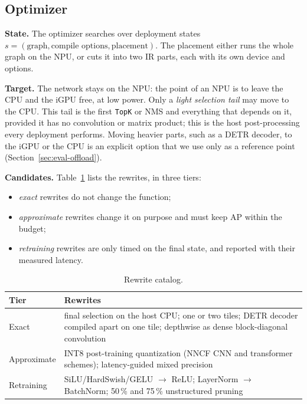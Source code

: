\documentclass[conference]{IEEEtran}
\begin{document}
\subsection{Optimizer}
\label{sec:optimizer}

\textbf{State.} The optimizer searches over deployment states $s = (\text{graph}, \text{compile options}, \text{placement})$. The placement either runs the whole graph on the NPU, or cuts it into two IR parts, each with its own device and options.

\textbf{Target.} The network stays on the NPU: the point of an NPU is to leave the CPU and the iGPU free, at low power. Only a \emph{light selection tail} may move to the CPU. This tail is the first \texttt{TopK} or NMS and everything that depends on it, provided it has no convolution or matrix product; this is the host post-processing every deployment performs. Moving heavier parts, such as a DETR decoder, to the iGPU or the CPU is an explicit option that we use only as a reference point (Section~\ref{sec:eval-offload}).

\textbf{Candidates.} Table~\ref{tab:catalog} lists the rewrites, in three tiers:
\begin{itemize}
\item \emph{exact} rewrites do not change the function;
\item \emph{approximate} rewrites change it on purpose and must keep AP within the budget;
\item \emph{retraining} rewrites are only timed on the final state, and reported with their measured latency.
\end{itemize}

\begin{table}[t]
\caption{Rewrite catalog.}
\label{tab:catalog}
\centering
\footnotesize
\begin{tabular}{@{}lp{}@{}}
\toprule
Tier & Rewrites \\
\midrule
Exact & final selection on the host CPU; one or two tiles; DETR decoder compiled apart on one tile; depthwise as dense block-diagonal convolution \\
Approximate & INT8 post-training quantization (NNCF CNN and transformer schemes); latency-guided mixed precision \\
Retraining & SiLU/HardSwish/GELU $\to$ ReLU; LayerNorm $\to$ BatchNorm; 50\,\% and 75\,\% unstructured pruning \\
\bottomrule
\end{tabular}
\end{table}
\end{document}
